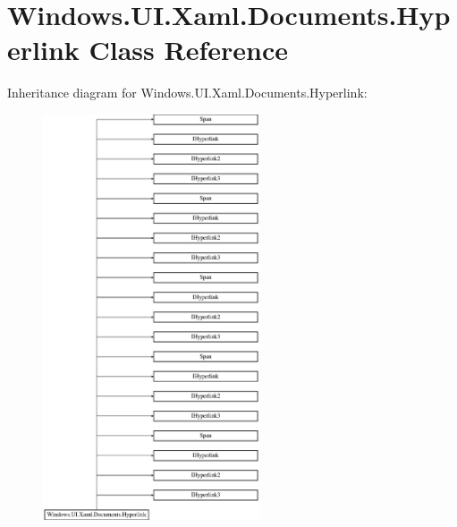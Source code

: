 \hypertarget{class_windows_1_1_u_i_1_1_xaml_1_1_documents_1_1_hyperlink}{}\section{Windows.\+U\+I.\+Xaml.\+Documents.\+Hyperlink Class Reference}
\label{class_windows_1_1_u_i_1_1_xaml_1_1_documents_1_1_hyperlink}
Inheritance diagram for Windows.\+U\+I.\+Xaml.\+Documents.\+Hyperlink\+:\begin{figure}[H]
\begin{center}
\leavevmode
\includegraphics[height=12.000000cm]{class_windows_1_1_u_i_1_1_xaml_1_1_documents_1_1_hyperlink}
\end{center}
\end{figure}
